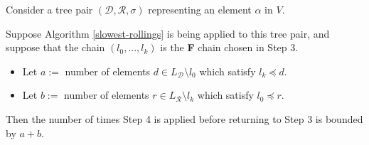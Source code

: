 \documentclass[12pt]{amsart}
\newcommand{\seteq}{:=}
\newcommand{\D}{\mathcal{D}}
\newcommand{\R}{\mathcal{R}}
\begin{document}
\begin{lemma}
    
    
    
    
    


\end{lemma}

\begin{lemma}
\label{step-4-bounded}
    Consider a tree pair $(\D,\R,\sigma)$ representing an element $\alpha$ in $V$. 
    
    Suppose Algorithm \ref{slowest-rollings} is being applied to this tree pair, and suppose that the chain $(l_0,...,l_k)$ is the \textbf{F} chain chosen in Step 3.
    \begin{itemize}
        \item Let $a\seteq$ number of elements $d\in L_{\D}\setminus l_0$ which satisfy $l_k\preceq d$.
        \item Let $b\seteq$ number of elements $r\in L_{\R}\setminus l_k$ which satisfy $l_0\preceq r$.
    \end{itemize}
    Then the number of times Step 4 is applied before returning to Step 3 is bounded by $a+b$.
\end{lemma}

\newpage


\end{document}
